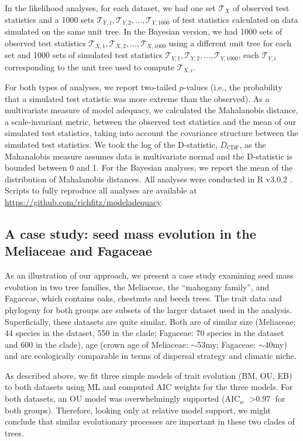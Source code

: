 In the likelihood analyses, for each dataset, we had one set $\mathcal{T}_X$ of observed test statistics and a 1000 sets $\mathcal{T}_{Y,\text{1}}, \mathcal{T}_{Y,\text{2}}, \ldots, \mathcal{T}_{Y,\text{1000}}$ of test statistics calculated on data simulated on the same unit tree. In the Bayesian version, we had 1000 sets of observed test statistics $\mathcal{T}_{X,\text{1}}, \mathcal{T}_{X,\text{2}}, \ldots, \mathcal{T}_{X,\text{1000}}$ using a different unit tree for each set and 1000 sets of simulated test statistics $\mathcal{T}_{Y,\text{1}}, \mathcal{T}_{Y,\text{2}}, \ldots, \mathcal{T}_{Y,\text{1000}}$, each $\mathcal{T}_{Y,i}$ corresponding to the unit tree used to compute $\mathcal{T}_{X,i}$.
 
For both types of analyses, we report two-tailed $p$-values (i.e., the probability that a simulated test statistic was more extreme than the observed). As a multivariate measure of model adequacy, we calculated the Mahalanobis distance, a scale-invariant metric, between the observed test statistics and the mean of our simulated test statistics, taking into account the covariance structure between the simulated test statistics. We took the log of the  D-statistic, $D_{\text{CDF}}$, as the Mahanalobis measure assumes data is multivariate normal and the D-statistic is bounded between 0 and 1. For the Bayesian analyses, we report the mean of the distribution of Mahalanobis distances. All analyses were conducted in R v3.0.2 \citep{R}. Scripts to fully reproduce all analyses are available at \url{https://github.com/richfitz/modeladequacy}.
  
\subsection{A case study: seed mass evolution in the Meliaceae and Fagaceae }
As an illustration of our approach, we present a case study examining seed mass evolution in two tree families, the Meliaceae, the ``mahogany family'', and Fagaceae, which contains oaks, chestnuts and beech trees. The trait data and phylogeny for both groups are subsets of the larger dataset used in the analysis. Superficially, these datasets are quite similar. Both are of similar size (Meliaceae: 44 species in the dataset, 550 in the clade; Fagaceae: 70 species in the dataset and 600 in the clade), age (crown age of Meliaceae: $\sim$53my; Fagaceae: $\sim$40my) and are ecologically comparable in terms of dispersal strategy and climatic niche. 

As described above, we fit three simple models of trait evolution (BM, OU, EB) to both datasets using ML and computed AIC weights \citep[AIC$_w$;][]{Akaike1974, aicweight} for the three models. For both datasets, an OU model was overwhelmingly supported (AIC$_w$ $>\text{0.97}$ for both groups). Therefore, looking only at relative model support, we might conclude that similar evolutionary processes are important in these two clades of trees.

